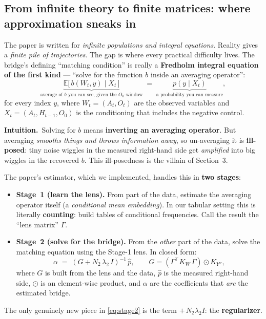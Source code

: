 \documentclass[11pt]{article}
\newcommand{\intuition}[1]{\vspace{2pt}\noindent\textbf{Intuition.}\ #1\par\vspace{2pt}}
\newcommand{\Ob}{O_0}
\begin{document}
\subsection{From infinite theory to finite matrices: where approximation sneaks in}
The paper is written for \emph{infinite populations and integral equations}. Reality
gives a \emph{finite pile of trajectories}. The gap is where every practical
difficulty lives. The bridge's defining ``matching condition'' is really a
\textbf{Fredholm integral equation of the first kind} --- ``solve for the function
$b$ inside an averaging operator'':
\begin{equation}
\underbrace{\mathbb{E}\big[\,b(W_t, y)\;\big|\;X_t\,\big]}_{\text{average of }b\text{ you can see, given the }\Ob\text{-window}}
\;=\;\underbrace{p(y\mid X_t)}_{\text{a probability you can measure}},
\end{equation}
for every index $y$, where $W_t=(A_t,O_t)$ are the observed variables and
$X_t=(A_t,H_{t-1},\Ob)$ is the conditioning that includes the negative control.

\intuition{Solving for $b$ means \textbf{inverting an averaging operator}. But
averaging \emph{smooths things and throws information away}, so un-averaging it is
\textbf{ill-posed}: tiny noise wiggles in the measured right-hand side get
\emph{amplified} into big wiggles in the recovered $b$. This ill-posedness is the
villain of Section~3.}

The paper's estimator, which we implemented, handles this in \textbf{two stages}:
\begin{itemize}
  \item \textbf{Stage~1 (learn the lens).} From part of the data, estimate the
  averaging operator itself (a \emph{conditional mean embedding}). In our tabular
  setting this is literally \textbf{counting}: build tables of conditional
  frequencies. Call the result the ``lens matrix'' $\Gamma$.
  \item \textbf{Stage~2 (solve for the bridge).} From the \emph{other} part of the
  data, solve the matching equation using the Stage-1 lens. In closed form:
  \begin{equation}
  \alpha \;=\; (G + N_2\,\lambda_2\,I)^{-1}\,\hat p,
  \qquad G=(\Gamma^\top K_W\,\Gamma)\odot K_{Y''},
  \label{eq:stage2}
  \end{equation}
  where $G$ is built from the lens and the data, $\hat p$ is the measured right-hand
  side, $\odot$ is an element-wise product, and $\alpha$ are the coefficients that
  \emph{are} the estimated bridge.
\end{itemize}
The only genuinely new piece in \eqref{eq:stage2} is the term
$+\,N_2\lambda_2 I$: the \textbf{regularizer}.
\end{document}
